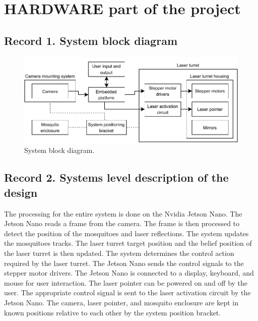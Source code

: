 
\section{HARDWARE part of the project}

\subsection{Record 1. System block diagram}
\begin{figure}[H]
  \centering
  \includegraphics[width=\textwidth]{figures/hardware_block_diagram.pdf}
  \caption{System block diagram.}
\end{figure}

\newpage
\subsection{Record 2.  Systems level description of the design}
The processing for the entire system is done on the Nvidia Jetson Nano. The Jetson Nano reads a frame from the camera. The frame is then processed to detect the position of the mosquitoes and laser reflections. The system updates the mosquitoes tracks. The laser turret target position and the belief position of the laser turret is then updated. The system determines the control action required by the laser turret. The Jetson Nano sends the control signals to the stepper motor drivers. The Jetson Nano is connected to a display, keyboard, and mouse for user interaction. The laser pointer can be powered on and off by the user. The appropriate control signal is sent to the laser activation circuit by the Jetson Nano. The camera, laser pointer, and mosquito enclosure are kept in known positions relative to each other by the system position bracket.

